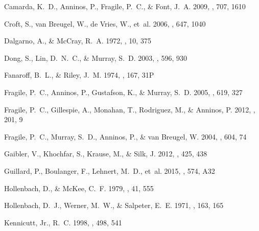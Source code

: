 \documentclass{aastex6}
\begin{document}
\begin{thebibliography}{}
{Camarda}, K.~D., {Anninos}, P., {Fragile}, P.~C., \& {Font}, J.~A. 2009, \apj,
  707, 1610

{Croft}, S., {van Breugel}, W., {de Vries}, W., {et~al.} 2006, \apj, 647, 1040

{Dalgarno}, A., \& {McCray}, R.~A. 1972, \araa, 10, 375

{Dong}, S., {Lin}, D.~N.~C., \& {Murray}, S.~D. 2003, \apj, 596, 930

{Fanaroff}, B.~L., \& {Riley}, J.~M. 1974, \mnras, 167, 31P

{Fragile}, P.~C., {Anninos}, P., {Gustafson}, K., \& {Murray}, S.~D. 2005,
  \apj, 619, 327

{Fragile}, P.~C., {Gillespie}, A., {Monahan}, T., {Rodriguez}, M., \&
  {Anninos}, P. 2012, \apjs, 201, 9

{Fragile}, P.~C., {Murray}, S.~D., {Anninos}, P., \& {van Breugel}, W. 2004,
  \apj, 604, 74

{Gaibler}, V., {Khochfar}, S., {Krause}, M., \& {Silk}, J. 2012, \mnras, 425,
  438

{Guillard}, P., {Boulanger}, F., {Lehnert}, M.~D., {et~al.} 2015, \aap, 574,
  A32

{Hollenbach}, D., \& {McKee}, C.~F. 1979, \apjs, 41, 555

{Hollenbach}, D.~J., {Werner}, M.~W., \& {Salpeter}, E.~E. 1971, \apj, 163, 165

{Kennicutt}, Jr., R.~C. 1998, \apj, 498, 541


\end{thebibliography}
\end{document}
